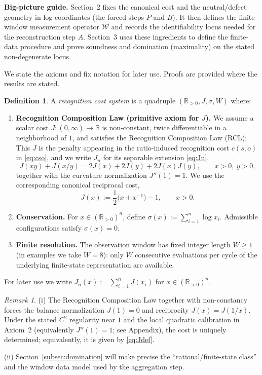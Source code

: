 \documentclass[11pt,reqno]{amsart}
\theoremstyle{definition}
\newtheorem{definition}[theorem]{Definition}
\theoremstyle{remark}
\newtheorem{remark}[theorem]{Remark} %
\newcommand{\Rp}{\mathbb{R}_{>0}}
\newcommand{\1}{\mathbf{1}}
\begin{document}
\medskip
\noindent\textbf{Big-picture guide.} Section~2 fixes the canonical cost and the neutral/defect geometry in log-coordinates (the forced steps $P$ and $B$). It then defines the finite-window measurement operator $\mathcal W$ and records the identifiability locus needed for the reconstruction step $A$. Section~3 uses these ingredients to define the finite-data procedure and prove soundness and domination (maximality) on the stated non-degenerate locus.
\medskip

We state the axioms and fix notation for later use. Proofs are provided where the results are stated. \begin{definition}\label{def:system}
A \emph{recognition cost system} is a quadruple $(\Rp,J,\sigma,W)$ where:
\begin{enumerate}[label=\textup{(C\arabic*)},leftmargin=2.2em]
\item \textbf{Recognition Composition Law (primitive axiom for $J$).}
We assume a scalar cost $J:(0,\infty)\to\mathbb{R}$ is non-constant, twice differentiable in a neighborhood of $1$, and satisfies the Recognition Composition Law (RCL):
This $J$ is the penalty appearing in the ratio-induced recognition cost $c(s,o)$ in \eqref{eq:cso}, and we write $J_n$ for its separable extension \eqref{eq:Jn}.
\begin{equation}\label{eq:RCL}
J(xy)+J(x/y)=2J(x)+2J(y)+2J(x)J(y),\qquad x>0,\ y>0,
\end{equation}
together with the curvature normalization $J''\!(1)=1$.
We use the corresponding canonical reciprocal cost,
\begin{equation}\label{eq:Jdef}
J(x):=\frac12\bigl(x+x^{-1}\bigr)-1,\qquad x>0.
\end{equation}
\item \textbf{Conservation.} For $x\in(\Rp)^n$, define
$\sigma(x):=\sum_{i=1}^n \log x_i$. Admissible configurations satisfy $\sigma(x)=0$.
\item \textbf{Finite resolution.} The observation window has fixed integer length $W\ge 1$ (in examples we take $W=8$):
only $W$ consecutive evaluations per cycle of the underlying finite-state representation
are available.
\end{enumerate}
\end{definition}

\noindent For later use we write $J_n(x):=\sum_{i=1}^n J(x_i)$ for $x\in(\Rp)^n$.

\begin{remark}
(i) The Recognition Composition Law together with non-constancy forces the balance normalization $J(1)=0$ and reciprocity $J(x)=J(1/x)$. Under the stated $C^2$ regularity near $1$ and the local quadratic calibration in Axiom~2 (equivalently $J''(1)=1$; see Appendix), the cost is uniquely determined; equivalently, it is given by \eqref{eq:Jdef}.

(ii) Section~\ref{subsec:domination} will make precise the ``rational/finite-state class'' and the
window data model used by the aggregation step.
\end{remark}
\end{document}
